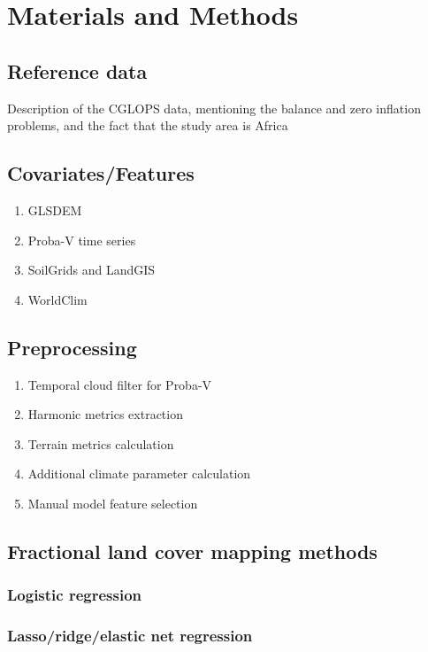 \documentclass[a4paper,10pt]{article}
\begin{document}
\section{Materials and Methods}

\subsection{Reference data}

Description of the CGLOPS data, mentioning the balance and zero inflation problems, and the fact that the study area is Africa

\subsection{Covariates/Features}

\begin{enumerate}
 \item GLSDEM
 \item Proba-V time series
 \item SoilGrids and LandGIS
 \item WorldClim
\end{enumerate}

\subsection{Preprocessing}

\begin{enumerate}
 \item Temporal cloud filter for Proba-V
 \item Harmonic metrics extraction
 \item Terrain metrics calculation
 \item Additional climate parameter calculation
 \item Manual model feature selection
\end{enumerate}

\subsection{Fractional land cover mapping methods}

\subsubsection{Logistic regression}

\subsubsection{Lasso/ridge/elastic net regression}
\end{document}
